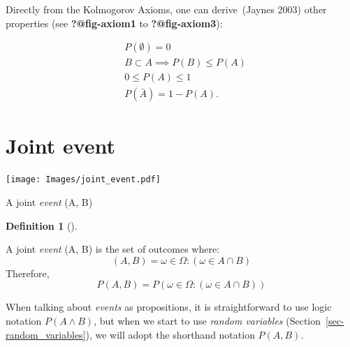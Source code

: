 \documentclass[
  letterpaper,
  12pt,
  british]{tufte-book}
\theoremstyle{plain}
\theoremstyle{definition}
\newtheorem{definition}{Definition}[chapter]
\theoremstyle{plain}
\theoremstyle{remark}
\begin{document}

Directly from the Kolmogorov Axioms, one can derive~(Jaynes
2003)
other properties (see \textbf{?@fig-axiom1} to \textbf{?@fig-axiom3}):

\begin{align}
&P(\emptyset)=0\\
&B \subset A \implies P(B) \leq P(A)\\
&0 \leq P(A) \leq 1\\
&P(\bar{A})=1-P(A).
\end{align}

\hypertarget{joint-event}{%
\section{Joint event}\label{joint-event}}

\begin{marginfigure}

{\centering \texttt{[image: Images/joint\_event.pdf]}

}

\caption{\label{fig-joint_event}A joint \emph{event} (A, B)}

\end{marginfigure}

\leavevmode{}%
\begin{definition}[]\label{def-joint_event}

A joint \emph{event} (A, B) is the set of outcomes where:
\[(A, B) = {\omega \in \Omega: (\omega \in A \cap B) }\] Therefore,
\[P(A, B) =P({\omega \in \Omega: (\omega \in A \cap B) })\]

\end{definition}

When talking about \emph{events} as propositions, it is straightforward
to use logic notation \(P(A \land B)\), but when we start to use
\emph{random variables} (Section~\ref{sec-random_variables}), we will
adopt the shorthand notation \(P(\mathit{A}, \mathit{B}).\)
\end{document}
